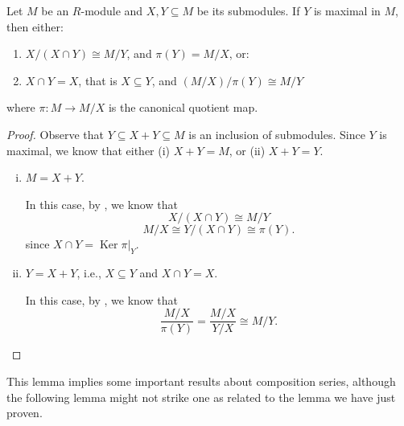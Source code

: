 \documentclass[12pt, a4paper, titlepage]{report}
\DeclareMathOperator{\Ker}{Ker}
\begin{document}
\begin{lem}
  \label{lem:maximal}
  Let $M$ be an $R$-module and $X, Y \subseteq M$ be its submodules. If $Y$ is maximal in $M$, then either:
  \begin{enumerate}[(1)]
  \item $X/(X \cap Y) \cong M/Y$, and $\pi(Y) = M/X$, or:
  \item $X \cap Y = X$, that is $X \subseteq Y$, and $(M/X)\big/\pi(Y) \cong M/Y$
  \end{enumerate}
  where $\pi : M \to M/X$ is the canonical quotient map.
\end{lem}

\begin{proof}
  Observe that $Y \subseteq X + Y \subseteq M$ is an inclusion of submodules. Since $Y$ is maximal, we know that either (i) $X + Y = M$, or
  (ii) $X + Y = Y$.

  \begin{enumerate}[(i)]
  \item $M = X + Y$.

    In this case, by , we know that
    \[
      X\big/(X \cap Y) \cong M / Y
    \]
    \[
      M/X \cong Y\big/(X \cap Y) \cong \pi(Y).
    \]
    since $X \cap Y = \Ker \pi \vert_Y$.

  \item $Y = X + Y$, i.e., $X \subseteq Y$ and $X \cap Y = X$.

    In this case, by , we know that
    \[
      \frac{M/X}{\pi(Y)} = \frac{M/X}{Y/X} \cong M/Y.
    \]
  \end{enumerate}
\end{proof}

This lemma implies some important results about composition series, although the following lemma might not strike one as related to
the lemma we have just proven.
\end{document}

